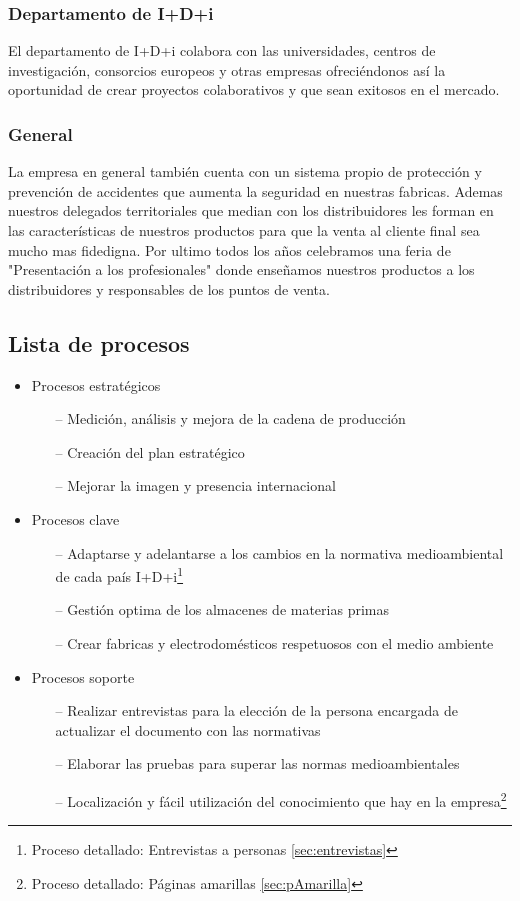\documentclass[a4paper]{article}
\begin{document}
\subsubsection{Departamento de I+D+i}
El departamento de I+D+i colabora con las universidades, centros de investigación, consorcios europeos y otras empresas ofreciéndonos así la oportunidad de crear proyectos colaborativos y que sean exitosos en el mercado.

\subsubsection{General}
La empresa en general también cuenta con un sistema propio de protección y prevención de accidentes que aumenta la seguridad en nuestras fabricas. Ademas nuestros delegados territoriales que median con los distribuidores les forman en las características de nuestros productos para que la venta al cliente final sea mucho mas fidedigna. Por ultimo todos los años celebramos una feria de "Presentación a los profesionales" donde enseñamos nuestros productos a los distribuidores y responsables de los puntos de venta.

\subsection{Lista de procesos}

\begin{itemize}
	\item Procesos estratégicos
	\begin{itemize}
		\item[--] Medición, análisis y mejora de la cadena de producción
		\item[--] Creación del plan estratégico
		\item[--] Mejorar la imagen y presencia internacional
	\end{itemize}
	\item Procesos clave
	\begin{itemize}
		\item[--] Adaptarse y adelantarse a los cambios en la normativa medioambiental de cada país I+D+i\footnote{Proceso detallado: Entrevistas a personas \ref{sec:entrevistas}}
		\item[--] Gestión optima de los almacenes de materias primas
		\item[--] Crear fabricas y electrodomésticos respetuosos con el medio ambiente
	\end{itemize}
	\item Procesos soporte
	\begin{itemize}
		\item[--] Realizar entrevistas para la elección de la persona encargada de actualizar el documento con las normativas
		\item[--] Elaborar las pruebas para superar las normas medioambientales
		\item[--] Localización y fácil utilización del conocimiento que hay en la empresa\footnote{Proceso detallado: Páginas amarillas \ref{sec:pAmarilla}}
	\end{itemize}
\end{itemize}
\end{document}
